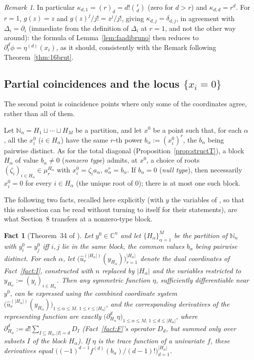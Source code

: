 \documentclass[11pt]{article}
\newtheorem{fact}[theorem]{Fact}
\theoremstyle{remark}
\newtheorem{remark}[theorem]{Remark}
\newcommand{\NN}{\mathbb{N}}
\newcommand{\CC}{\mathbb{C}}
\begin{document}
\begin{remark}
In particular $\kappa_{d,1}=(r)_d=d!\binom{r}{d}$ (zero for $d>r$) and $\kappa_{d,d}=r^d$. For $r=1$, $g(z)=z$ and $g(z)^j/j!=z^j/j!$, giving $\kappa_{d,j}=\delta_{d,j}$, in agreement with $\Delta_i=\partial_i$ (immediate from the definition of $\Delta_i$ at $r=1$, and not the other way around): the formula of Lemma~\ref{lem:faadibruno} then reduces to $\partial_i^d\phi=\eta^{(d)}(x_i)$, as it should, consistently with the Remark following Theorem~\ref{thm:16brut}.
\end{remark}

\subsection{Partial coincidences and the locus $\{x_i=0\}$}

The second point is coincidence points where only some of the coordinates agree, rather than all of them.

Let $\NN_n=H_1\sqcup\cdots\sqcup H_M$ be a partition, and let $x^0$ be a point such that, for each $\alpha$, all the $x_i^0$ ($i\in H_\alpha$) have the same $r$-th power $b_\alpha:=(x_i^0)^r$, the $b_\alpha$ being pairwise distinct. As for the total diagonal (Proposition~\ref{prop:structT}), a block $H_\alpha$ of value $b_\alpha\ne0$ (\emph{nonzero type}) admits, at $x^0$, a choice of roots $(\zeta_i)_{i\in H_\alpha}\in\mu_r^{H_\alpha}$ with $x_i^0=\zeta_ia_\alpha$, $a_\alpha^r=b_\alpha$. If $b_\alpha=0$ (\emph{null type}), then necessarily $x_i^0=0$ for every $i\in H_\alpha$ (the unique root of $0$); there is at most one such block.

The following two facts, recalled here explicitly (with $y$ the variables of \cite{Ze}, so that this subsection can be read without turning to \cite{Ze} itself for their statements), are what Section~8 transfers at a nonzero-type block.

\begin{fact}[Theorem~34 of \cite{Ze}]\label{fact:M}
Let $y^0\in\CC^n$ and let $\{H_\alpha\}_{\alpha=1}^M$ be the partition of $\NN_n$ with $y_i^0=y_j^0$ iff $i,j$ lie in the same block, the common values $b_\alpha$ being pairwise distinct. For each $\alpha$, let $\big(\hat u_r^{(|H_\alpha|)}(y_{H_\alpha})\big)_{r=1}^{|H_\alpha|}$ denote the dual coordinates of Fact~\ref{fact:I}, constructed with $n$ replaced by $|H_\alpha|$ and the variables restricted to $y_{H_\alpha}:=(y_i)_{i\in H_\alpha}$. Then any symmetric function $\eta$, sufficiently differentiable near $y^0$, can be expressed using the combined coordinate system $\big(\hat u_r^{(|H_\alpha|)}(y_{H_\alpha})\big)_{1\le\alpha\le M,\,1\le r\le|H_\alpha|}$, and the corresponding derivatives of the representing function are exactly $\big(\partial_{H_\alpha}^d\eta\big)_{1\le\alpha\le M,\,1\le d\le|H_\alpha|}$, where $\partial_{H_\alpha}^d:=d!\sum_{I\subseteq H_\alpha,|I|=d}D_I$ (Fact~\ref{fact:F}'s operator $D_d$, but summed only over subsets $I$ of the block $H_\alpha$). If $\eta$ is the trace function of a univariate $f$, these derivatives equal $\big((-1)^{d-1}f^{(d)}(b_\alpha)/(d-1)!\big)_{d=1}^{|H_\alpha|}$.
\end{fact}
\end{document}
